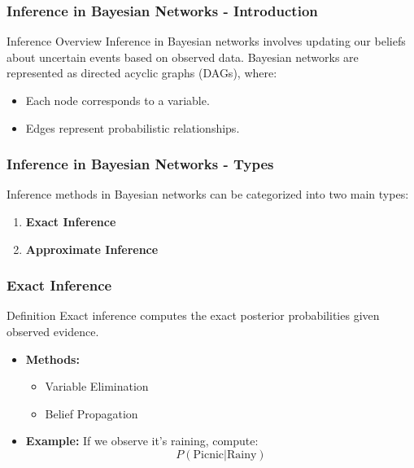 \documentclass[aspectratio=169]{beamer}
\begin{document}
\begin{frame}[fragile]
    \frametitle{Inference in Bayesian Networks - Introduction}
    \begin{block}{Inference Overview}
        Inference in Bayesian networks involves updating our beliefs about uncertain events based on observed data. Bayesian networks are represented as directed acyclic graphs (DAGs), where:
    \end{block}
    \begin{itemize}
        \item Each node corresponds to a variable.
        \item Edges represent probabilistic relationships.
    \end{itemize}
\end{frame}

\begin{frame}[fragile]
    \frametitle{Inference in Bayesian Networks - Types}
    Inference methods in Bayesian networks can be categorized into two main types:
    
    \begin{enumerate}
        \item \textbf{Exact Inference}
        \item \textbf{Approximate Inference}
    \end{enumerate}
\end{frame}

\begin{frame}[fragile]
    \frametitle{Exact Inference}
    \begin{block}{Definition}
        Exact inference computes the exact posterior probabilities given observed evidence.
    \end{block}
    \begin{itemize}
        \item \textbf{Methods:}
            \begin{itemize}
                \item Variable Elimination
                \item Belief Propagation
            \end{itemize}
        \item \textbf{Example:}
            If we observe it’s raining, compute:
            \[
            P(\text{Picnic} | \text{Rainy})
            \]
    \end{itemize}
\end{frame}
\end{document}
